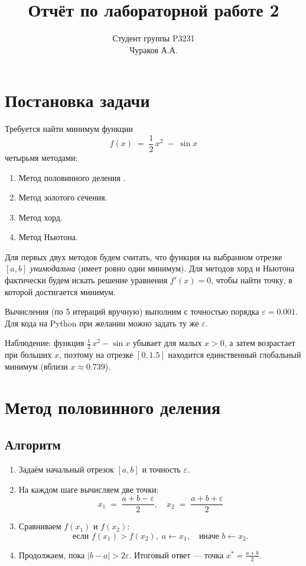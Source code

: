 \documentclass[12pt]{article}
\title{Отчёт по лабораторной работе 2}
\author{Студент группы P3231\\
Чураков А.А.}
\begin{document}
\maketitle

\section{Постановка задачи}

Требуется найти минимум функции
\[
f(x) \;=\; \frac{1}{2}\,x^2 \;-\; \sin x
\]
четырьмя методами:
\begin{enumerate}
    \item Метод половинного деления .
    \item Метод золотого сечения.
    \item Метод хорд.
    \item Метод Ньютона.
\end{enumerate}

Для первых двух методов будем считать, что функция на выбранном отрезке \([a,b]\) \emph{унимодальна} (имеет ровно один минимум).  
Для методов хорд и Ньютона фактически будем искать решение уравнения $f'(x) = 0$, чтобы найти точку, в которой достигается минимум.

Вычисления (по 5 итераций вручную) выполним с точностью порядка $\varepsilon = 0.001$. Для кода на Python при желании можно задать ту же $\varepsilon$.

Наблюдение: функция $\frac12\,x^2 - \sin x$ убывает для малых $x>0$, а затем возрастает при больших $x$, поэтому на отрезке $[0,1.5]$ находится единственный глобальный минимум (вблизи $x\approx 0.739$).

\section{Метод половинного деления}

\subsection{Алгоритм}

\begin{enumerate}
\item Задаём начальный отрезок $[a,b]$ и точность $\varepsilon$.
\item На каждом шаге вычисляем две точки:
\[
   x_1 \;=\; \frac{a + b - \varepsilon}{2}, \quad x_2 \;=\; \frac{a + b + \varepsilon}{2}
\]
\item Сравниваем $f(x_1)$ и $f(x_2)$:
  \[
    \text{если } f(x_1) > f(x_2), \; a \leftarrow x_1, 
    \quad \text{иначе } b \leftarrow x_2.
  \]
\item Продолжаем, пока $|b-a| > 2\varepsilon$. Итоговый ответ — точка $x^* = \frac{a+b}{2}$.
\end{enumerate}
\end{document}
